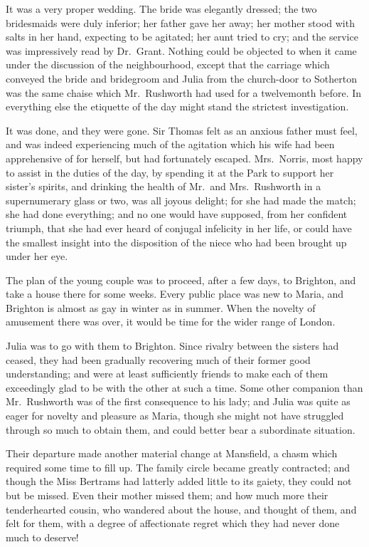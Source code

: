 \documentclass{article}
\begin{document}
It was a very proper wedding.  The bride was elegantly dressed;
the two bridesmaids were duly inferior; her father gave
her away; her mother stood with salts in her hand,
expecting to be agitated; her aunt tried to cry;
and the service was impressively read by Dr.\ Grant.
Nothing could be objected to when it came under the
discussion of the neighbourhood, except that the carriage
which conveyed the bride and bridegroom and Julia
from the church-door to Sotherton was the same chaise
which Mr.\ Rushworth had used for a twelvemonth before.
In everything else the etiquette of the day might stand
the strictest investigation.

It was done, and they were gone.  Sir Thomas felt as an
anxious father must feel, and was indeed experiencing much
of the agitation which his wife had been apprehensive
of for herself, but had fortunately escaped.  Mrs.\ Norris,
most happy to assist in the duties of the day,
by spending it at the Park to support her sister's spirits,
and drinking the health of Mr.\ and Mrs.\ Rushworth in
a supernumerary glass or two, was all joyous delight;
for she had made the match; she had done everything;
and no one would have supposed, from her confident triumph,
that she had ever heard of conjugal infelicity in her life,
or could have the smallest insight into the disposition
of the niece who had been brought up under her eye.

The plan of the young couple was to proceed,
after a few days, to Brighton, and take a house there
for some weeks.  Every public place was new to Maria,
and Brighton is almost as gay in winter as in summer.
When the novelty of amusement there was over, it would
be time for the wider range of London.

Julia was to go with them to Brighton.  Since rivalry
between the sisters had ceased, they had been gradually
recovering much of their former good understanding;
and were at least sufficiently friends to make each of them
exceedingly glad to be with the other at such a time.
Some other companion than Mr.\ Rushworth was of the first
consequence to his lady; and Julia was quite as eager
for novelty and pleasure as Maria, though she might not
have struggled through so much to obtain them, and could
better bear a subordinate situation.

Their departure made another material change at Mansfield,
a chasm which required some time to fill up.  The family
circle became greatly contracted; and though the Miss
Bertrams had latterly added little to its gaiety,
they could not but be missed.  Even their mother missed them;
and how much more their tenderhearted cousin, who wandered
about the house, and thought of them, and felt for them,
with a degree of affectionate regret which they had never
done much to deserve!
\end{document}
